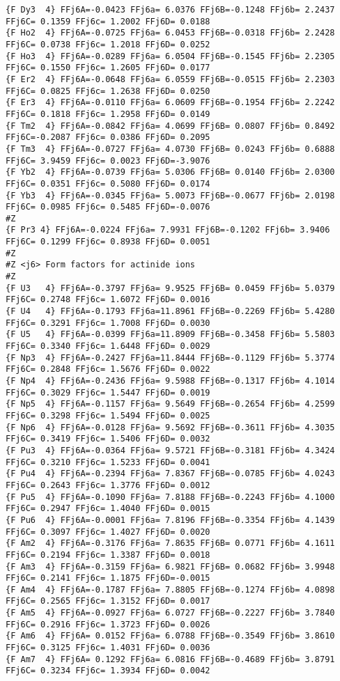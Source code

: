 {\begin{verbatim}
{F Dy3  4} FFj6A=-0.0423 FFj6a= 6.0376 FFj6B=-0.1248 FFj6b= 2.2437 FFj6C= 0.1359 FFj6c= 1.2002 FFj6D= 0.0188 
{F Ho2  4} FFj6A=-0.0725 FFj6a= 6.0453 FFj6B=-0.0318 FFj6b= 2.2428 FFj6C= 0.0738 FFj6c= 1.2018 FFj6D= 0.0252 
{F Ho3  4} FFj6A=-0.0289 FFj6a= 6.0504 FFj6B=-0.1545 FFj6b= 2.2305 FFj6C= 0.1550 FFj6c= 1.2605 FFj6D= 0.0177 
{F Er2  4} FFj6A=-0.0648 FFj6a= 6.0559 FFj6B=-0.0515 FFj6b= 2.2303 FFj6C= 0.0825 FFj6c= 1.2638 FFj6D= 0.0250 
{F Er3  4} FFj6A=-0.0110 FFj6a= 6.0609 FFj6B=-0.1954 FFj6b= 2.2242 FFj6C= 0.1818 FFj6c= 1.2958 FFj6D= 0.0149 
{F Tm2  4} FFj6A=-0.0842 FFj6a= 4.0699 FFj6B= 0.0807 FFj6b= 0.8492 FFj6C=-0.2087 FFj6c= 0.0386 FFj6D= 0.2095 
{F Tm3  4} FFj6A=-0.0727 FFj6a= 4.0730 FFj6B= 0.0243 FFj6b= 0.6888 FFj6C= 3.9459 FFj6c= 0.0023 FFj6D=-3.9076 
{F Yb2  4} FFj6A=-0.0739 FFj6a= 5.0306 FFj6B= 0.0140 FFj6b= 2.0300 FFj6C= 0.0351 FFj6c= 0.5080 FFj6D= 0.0174 
{F Yb3  4} FFj6A=-0.0345 FFj6a= 5.0073 FFj6B=-0.0677 FFj6b= 2.0198 FFj6C= 0.0985 FFj6c= 0.5485 FFj6D=-0.0076 
#Z
{F Pr3 4} FFj6A=-0.0224 FFj6a= 7.9931 FFj6B=-0.1202 FFj6b= 3.9406 FFj6C= 0.1299 FFj6c= 0.8938 FFj6D= 0.0051 
#Z
#Z <j6> Form factors for actinide ions
#Z
{F U3   4} FFj6A=-0.3797 FFj6a= 9.9525 FFj6B= 0.0459 FFj6b= 5.0379 FFj6C= 0.2748 FFj6c= 1.6072 FFj6D= 0.0016 
{F U4   4} FFj6A=-0.1793 FFj6a=11.8961 FFj6B=-0.2269 FFj6b= 5.4280 FFj6C= 0.3291 FFj6c= 1.7008 FFj6D= 0.0030 
{F U5   4} FFj6A=-0.0399 FFj6a=11.8909 FFj6B=-0.3458 FFj6b= 5.5803 FFj6C= 0.3340 FFj6c= 1.6448 FFj6D= 0.0029 
{F Np3  4} FFj6A=-0.2427 FFj6a=11.8444 FFj6B=-0.1129 FFj6b= 5.3774 FFj6C= 0.2848 FFj6c= 1.5676 FFj6D= 0.0022 
{F Np4  4} FFj6A=-0.2436 FFj6a= 9.5988 FFj6B=-0.1317 FFj6b= 4.1014 FFj6C= 0.3029 FFj6c= 1.5447 FFj6D= 0.0019 
{F Np5  4} FFj6A=-0.1157 FFj6a= 9.5649 FFj6B=-0.2654 FFj6b= 4.2599 FFj6C= 0.3298 FFj6c= 1.5494 FFj6D= 0.0025 
{F Np6  4} FFj6A=-0.0128 FFj6a= 9.5692 FFj6B=-0.3611 FFj6b= 4.3035 FFj6C= 0.3419 FFj6c= 1.5406 FFj6D= 0.0032 
{F Pu3  4} FFj6A=-0.0364 FFj6a= 9.5721 FFj6B=-0.3181 FFj6b= 4.3424 FFj6C= 0.3210 FFj6c= 1.5233 FFj6D= 0.0041 
{F Pu4  4} FFj6A=-0.2394 FFj6a= 7.8367 FFj6B=-0.0785 FFj6b= 4.0243 FFj6C= 0.2643 FFj6c= 1.3776 FFj6D= 0.0012 
{F Pu5  4} FFj6A=-0.1090 FFj6a= 7.8188 FFj6B=-0.2243 FFj6b= 4.1000 FFj6C= 0.2947 FFj6c= 1.4040 FFj6D= 0.0015 
{F Pu6  4} FFj6A=-0.0001 FFj6a= 7.8196 FFj6B=-0.3354 FFj6b= 4.1439 FFj6C= 0.3097 FFj6c= 1.4027 FFj6D= 0.0020 
{F Am2  4} FFj6A=-0.3176 FFj6a= 7.8635 FFj6B= 0.0771 FFj6b= 4.1611 FFj6C= 0.2194 FFj6c= 1.3387 FFj6D= 0.0018 
{F Am3  4} FFj6A=-0.3159 FFj6a= 6.9821 FFj6B= 0.0682 FFj6b= 3.9948 FFj6C= 0.2141 FFj6c= 1.1875 FFj6D=-0.0015 
{F Am4  4} FFj6A=-0.1787 FFj6a= 7.8805 FFj6B=-0.1274 FFj6b= 4.0898 FFj6C= 0.2565 FFj6c= 1.3152 FFj6D= 0.0017 
{F Am5  4} FFj6A=-0.0927 FFj6a= 6.0727 FFj6B=-0.2227 FFj6b= 3.7840 FFj6C= 0.2916 FFj6c= 1.3723 FFj6D= 0.0026 
{F Am6  4} FFj6A= 0.0152 FFj6a= 6.0788 FFj6B=-0.3549 FFj6b= 3.8610 FFj6C= 0.3125 FFj6c= 1.4031 FFj6D= 0.0036 
{F Am7  4} FFj6A= 0.1292 FFj6a= 6.0816 FFj6B=-0.4689 FFj6b= 3.8791 FFj6C= 0.3234 FFj6c= 1.3934 FFj6D= 0.0042 

\end{verbatim}
}

